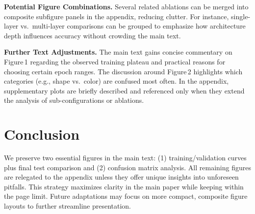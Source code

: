 \documentclass[11pt]{article}
\begin{document}
\textbf{Potential Figure Combinations.} Several related ablations can be merged into composite subfigure panels in the appendix, reducing clutter. For instance, single-layer vs.\ multi-layer comparisons can be grouped to emphasize how architecture depth influences accuracy without crowding the main text.

\textbf{Further Text Adjustments.} The main text gains concise commentary on Figure\,1 regarding the observed training plateau and practical reasons for choosing certain epoch ranges. The discussion around Figure\,2 highlights which categories (e.g., shape vs.\ color) are confused most often. In the appendix, supplementary plots are briefly described and referenced only when they extend the analysis of sub-configurations or ablations.

\section{Conclusion}
We preserve two essential figures in the main text: (1) training/validation curves plus final test comparison and (2) confusion matrix analysis. All remaining figures are relegated to the appendix unless they offer unique insights into unforeseen pitfalls. This strategy maximizes clarity in the main paper while keeping within the page limit. Future adaptations may focus on more compact, composite figure layouts to further streamline presentation.



\end{document}
